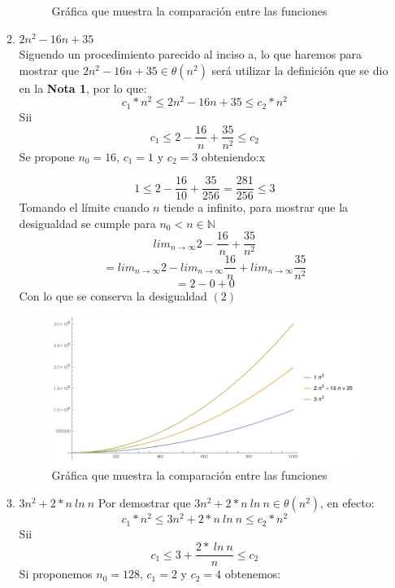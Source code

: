 \documentclass[11 pt, a4paper]{article}
\theoremstyle{definition}
\begin{document}
\begin{enumerate}
\begin{enumerate}
\begin{figure}[H]
          \caption{Gráfica que muestra la comparación entre las funciones}
      \end{figure}
  \item $2n^2 - 16 n + 35$\\
  Siguendo un procedimiento parecido al inciso a, lo que haremos 
  para mostrar que $2n^2 - 16 n + 35 \in \theta(n^2)$ será utilizar 
  la definición que se dio en la \textbf{Nota 1}, por lo que:
  \begin{equation}
   c_1*n^2 \leq 2n^2 - 16 n + 35 \leq c_2*n^2
  \end{equation}
  Sii
  \[c_1 \leq 2 - \frac{16}{n} + \frac{35}{n^2} \leq c_2 \]
  Se propone $n_0 = 16$, $c_1 = 1$ y $c_2 = 3$ obteniendo:x
  
  \[ 1 \leq 2 - \frac{16}{10} + \frac{35}{256} = \frac{281}{256}\leq 3 \]
  Tomando el límite cuando $n$ tiende a infinito, para mostrar que la 
  desigualdad se cumple para  $n_0 < n \in \mathbb{N}$
  \[
   lim_{n \rightarrow \infty} 2 - \frac{16}{n} + \frac{35}{n^2}\]
   \[= lim_{n \rightarrow \infty} 2 - lim_{n \rightarrow \infty} \frac{16}{n} + lim_{n \rightarrow \infty} \frac{35}{n^2}\]
   \[= 2 - 0 +0   \]
  Con lo que se conserva la desigualdad $(2)$
    \begin{figure}[H]
         \centering
          \includegraphics[trim=0cm 0cm 0cm 0cm, width=15cm]{inciso2.png} 
          \caption{Gráfica que muestra la comparación entre las funciones}
      \end{figure}
   \item $3 n^2 + 2* n\ ln\ n$
  Por demostrar que $3 n^2 + 2* n\ ln\ n \in \theta (n^2) $, en efecto:
  \begin{equation}
      c_1*n^2 \leq 3 n^2 + 2 * n\ ln\ n\leq c_2*n^2
  \end{equation}
  Sii
  \[  c_1\leq 3 + \frac{2 * \ ln\ n} {n}\leq c_2\]
  Si proponemos $n_0 = 128$, $c_1= 2$ y $c_2 = 4 $ obtenemos:

\end{enumerate}
\end{enumerate}
\end{document}
